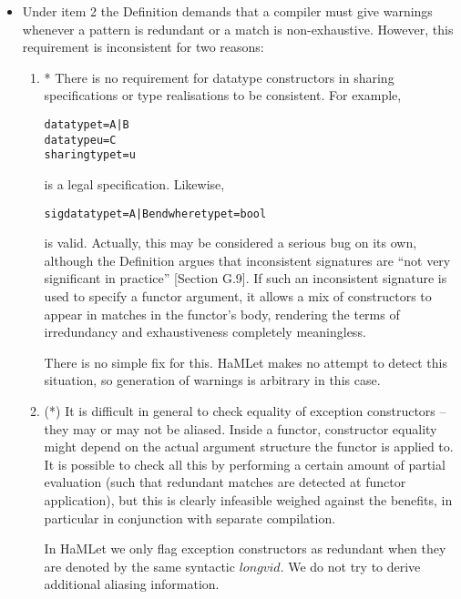 \documentclass[twoside,titlepage]{article}
\begin{document}
\begin{appendix}
\begin{itemize}
\item Under item 2 the Definition demands that a compiler must give warnings whenever a pattern is redundant or a match is non-exhaustive. However, this requirement is inconsistent for two reasons:

\begin{enumerate}

\item * There is no requirement for  datatype constructors in sharing specifications or type realisations to be consistent. For example,

\begin{quoting}
\begin{alltt}
datatype t = A | B
datatype u = C
sharing type t = u
\end{alltt}
\end{quoting}

is a legal specification. Likewise,

\begin{quoting}
\begin{alltt}
sig datatype t = A | B end where type t = bool
\end{alltt}
\end{quoting}

is valid. Actually, this may be considered a serious bug on its own, although the Definition argues that inconsistent signatures are ``not very significant in practice'' [Section G.9]. If such an inconsistent signature is used to specify a functor argument, it allows a mix of constructors to appear in matches in the functor's body, rendering the terms of irredundancy and exhaustiveness completely meaningless.

There is no simple fix for this. HaMLet makes no attempt to detect this situation, so generation of warnings is arbitrary in this case.

\item (*) It is difficult in general to check equality of exception constructors -- they may or may not be aliased. Inside a functor, constructor equality might depend on the actual argument structure the functor is applied to. It is possible to check all this by performing a certain amount of partial evaluation (such that redundant matches are detected at functor application), but this is clearly infeasible weighed against the benefits, in particular in conjunction with separate compilation.

In HaMLet we only flag exception constructors as redundant when they are denoted by the same syntactic $\mathit{longvid}$. We do not try to derive additional aliasing information.


\end{enumerate}
\end{itemize}
\end{appendix}
\end{document}

